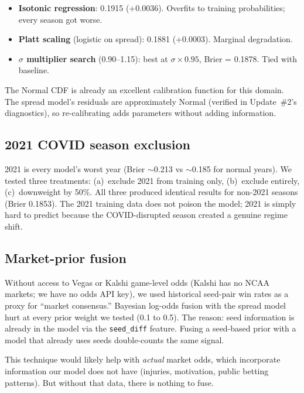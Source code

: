 \documentclass[11pt,a4paper]{article}
\begin{document}
\begin{itemize}[nosep]
    \item \textbf{Isotonic regression}: 0.1915 (+0.0036). Overfits to training probabilities; every season got worse.
    \item \textbf{Platt scaling} (logistic on spread): 0.1881 (+0.0003). Marginal degradation.
    \item \textbf{$\sigma$ multiplier search} (0.90--1.15): best at $\sigma \times 0.95$, Brier = 0.1878. Tied with baseline.
\end{itemize}

The Normal CDF is already an excellent calibration function for this domain. The spread model's residuals are approximately Normal (verified in Update~\#2's diagnostics), so re-calibrating adds parameters without adding information.

\subsection{2021 COVID season exclusion}

2021 is every model's worst year (Brier $\sim$0.213 vs $\sim$0.185 for normal years). We tested three treatments: (a)~exclude 2021 from training only, (b)~exclude entirely, (c)~downweight by 50\%. All three produced identical results for non-2021 seasons (Brier 0.1853). The 2021 training data does not poison the model; 2021 is simply hard to predict because the COVID-disrupted season created a genuine regime shift.

\subsection{Market-prior fusion}

Without access to Vegas or Kalshi game-level odds (Kalshi has no NCAA markets; we have no odds API key), we used historical seed-pair win rates as a proxy for ``market consensus.'' Bayesian log-odds fusion with the spread model hurt at every prior weight we tested (0.1 to 0.5). The reason: seed information is already in the model via the \texttt{seed\_diff} feature. Fusing a seed-based prior with a model that already uses seeds double-counts the same signal.

This technique would likely help with \textit{actual} market odds, which incorporate information our model does not have (injuries, motivation, public betting patterns). But without that data, there is nothing to fuse.


\end{document}
